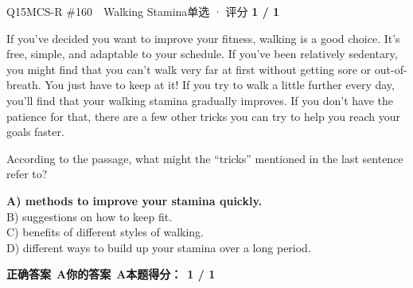 \begin{qblock}{Q15\quad MCS-R \#160\ \ Walking Stamina}{单选 · 评分 \textcolor{cAccent}{\bfseries 1 / 1}}
\begin{promptbox}
If you've decided you want to improve your fitness, walking is a good choice. It's free, simple, and adaptable to your schedule. If you've been relatively sedentary, you might find that you can't walk very far at first without getting sore or out-of-breath. You just have to keep at it! If you try to walk a little further every day, you'll find that your walking stamina gradually improves. If you don't have the patience for that, there are a few other tricks you can try to help you reach your goals faster.
\end{promptbox}
\begin{notebox}According to the passage, what might the ``tricks'' mentioned in the last sentence refer to?\end{notebox}
{\small
{\color{cFix}\textbf{A) methods to improve your stamina quickly.}}\\
B) suggestions on how to keep fit.\\
C) benefits of different styles of walking.\\
D) different ways to build up your stamina over a long period.}
\par\smallskip
\textbf{正确答案}\ \textcolor{cFix}{\bfseries A}\qquad\textbf{你的答案}\ \textcolor{cFix}{\bfseries A}\qquad\textbf{本题得分：}\ {\color{cAccent}\bfseries 1 / 1}
\end{qblock}

